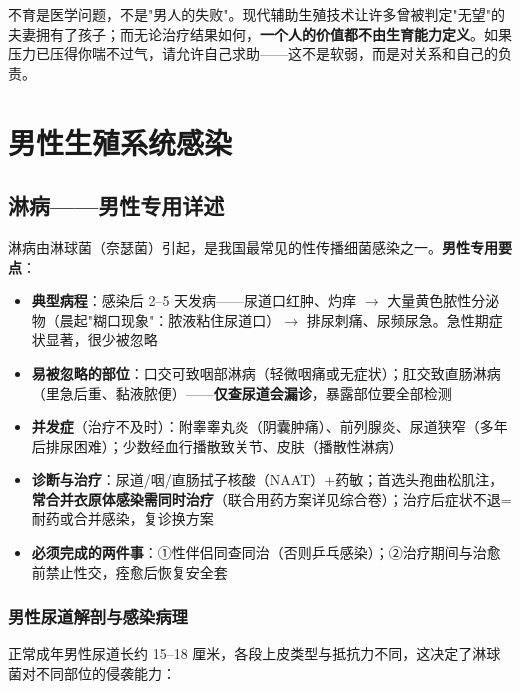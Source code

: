\documentclass[12pt,a4paper,twoside]{ctexbook}
\begin{document}
\begin{tcolorbox}[colback=pink!5!white,colframe=red!50!black,title=贴心小叮咛]
不育是医学问题，不是"男人的失败"。现代辅助生殖技术让许多曾被判定"无望"的夫妻拥有了孩子；而无论治疗结果如何，\textbf{一个人的价值都不由生育能力定义}。如果压力已压得你喘不过气，请允许自己求助——这不是软弱，而是对关系和自己的负责。
\end{tcolorbox}


\section{男性生殖系统感染}


\subsection{淋病——男性专用详述}


淋病由淋球菌（奈瑟菌）引起，是我国最常见的性传播细菌感染之一。\textbf{男性专用要点}：

\begin{itemize}
	\item \textbf{典型病程}：感染后 2--5 天发病——尿道口红肿、灼痒 $\rightarrow$ 大量黄色脓性分泌物（晨起"糊口现象"：脓液粘住尿道口）$\rightarrow$ 排尿刺痛、尿频尿急。急性期症状显著，很少被忽略
	\item \textbf{易被忽略的部位}：口交可致咽部淋病（轻微咽痛或无症状）；肛交致直肠淋病（里急后重、黏液脓便）——\textbf{仅查尿道会漏诊}，暴露部位要全部检测
	\item \textbf{并发症}（治疗不及时）：附睾睾丸炎（阴囊肿痛）、前列腺炎、尿道狭窄（多年后排尿困难）；少数经血行播散致关节、皮肤（播散性淋病）
	\item \textbf{诊断与治疗}：尿道/咽/直肠拭子核酸（NAAT）+药敏；首选头孢曲松肌注，\textbf{常合并衣原体感染需同时治疗}（联合用药方案详见综合卷）；治疗后症状不退=耐药或合并感染，复诊换方案
	\item \textbf{必须完成的两件事}：①性伴侣同查同治（否则乒乓感染）；②治疗期间与治愈前禁止性交，痊愈后恢复安全套
\end{itemize}

\subsubsection{男性尿道解剖与感染病理}

正常成年男性尿道长约 15--18 厘米，各段上皮类型与抵抗力不同，这决定了淋球菌对不同部位的侵袭能力：
\end{document}

